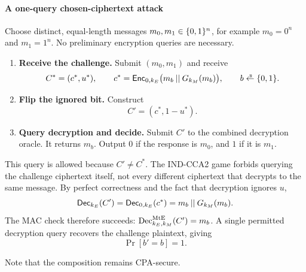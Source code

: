 \paragraph{A one-query chosen-ciphertext attack}

Choose distinct, equal-length messages $m_0,m_1\in\{0,1\}^n$, for example
$m_0=0^n$ and $m_1=1^n$. No preliminary encryption queries are necessary.

\begin{enumerate}
  \item \textbf{Receive the challenge.} Submit $(m_0,m_1)$ and receive
    \[
      C^*=(c^*,u^*),
      \qquad
      c^*=\Enc_{0,k_E}\bigl(m_b\concat G_{k_M}(m_b)\bigr),
      \qquad b\getsr\bits.
    \]
  \item \textbf{Flip the ignored bit.} Construct
    \[
      \boxed{C'=(c^*,1-u^*).}
    \]
  \item \textbf{Query decryption and decide.} Submit $C'$ to the combined
    decryption oracle. It returns $m_b$. Output $0$ if the response is $m_0$,
    and $1$ if it is $m_1$.
\end{enumerate}

This query is allowed because $C'\ne C^*$. The IND-CCA2 game forbids querying
the challenge ciphertext itself, not every different ciphertext that decrypts
to the same message. By perfect correctness and the fact that decryption
ignores $u$,
\[
  \mathsf{Dec}_{k_E}(C')
    =\mathsf{Dec}_{0,k_E}(c^*)
    =m_b\mathbin{||} G_{k_M}(m_b).
\]
The MAC check therefore succeeds: $\operatorname{Dec}^{\mathrm{MtE}}_{k_E,k_M}(C')=m_b$. A single
permitted decryption query recovers the challenge plaintext, giving
\begin{equation}
  \boxed{\Pr[b'=b]=1.}
\end{equation}

Note that the composition remains CPA-secure.

